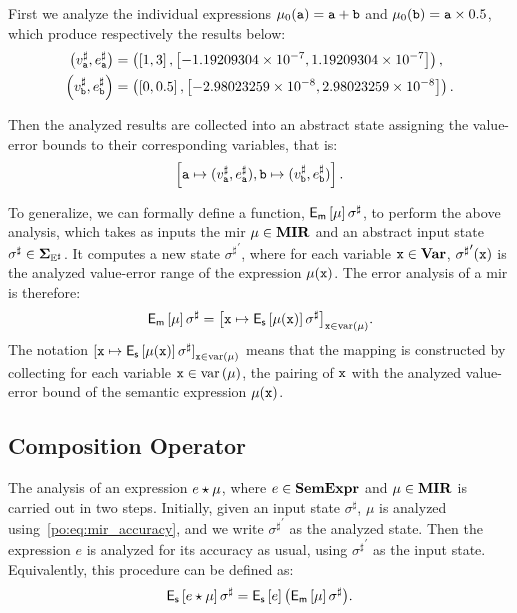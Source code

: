 First we analyze the individual expressions $\mu_0(\texttt{a}) = \texttt{a} + \texttt{b}$
and $\mu_0(\texttt{b}) = \texttt{a} \times 0.5$, which produce respectively the results
below:
\begin{align}
    \left(
        v^\sharp_{\texttt{a}}, e^\sharp_{\texttt{a}}
    \right) &= \left(
        \left[{1}, {3}\right],
        \left[{-1.19209304 \times 10^{-7}}, {1.19209304 \times 10^{-7}}\right]
    \right), \\
    \left(
        v^\sharp_{\texttt{b}}, e^\sharp_{\texttt{b}}
    \right) &= \left(
        \left[{0}, {0.5}\right],
        \left[{-2.98023259 \times 10^{-8}}, {2.98023259 \times 10^{-8}}\right]
    \right).
\end{align}

Then the analyzed results are collected into an abstract state assigning the
value-error bounds to their corresponding variables, that is:
\begin{equation}
    \left[
        \texttt{a} \mapsto (v^\sharp_{\texttt{a}}, e^\sharp_{\texttt{a}}),
        \texttt{b} \mapsto (v^\sharp_{\texttt{b}}, e^\sharp_{\texttt{b}})
    \right].
\end{equation}

To generalize, we can formally define a function,
$\operatorname{\mathsf{E}_\mathsf{m}}\left[{\mu}\right]{\sigma^\sharp}$, to perform the above analysis,
which takes as inputs the \gls{mir} $\mu \in \mathbf{MIR}$ and an abstract
input state $\sigma^\sharp \in \mathbf{\Sigma}_{\mathbb{E}^\sharp}$.  It computes a new state
${\sigma^\sharp}^\prime$, where for each variable $\texttt{x} \in \mathbf{Var}$,
${\sigma^\sharp}^\prime(\texttt{x})$ is the analyzed value-error range of the
expression $\mu(\texttt{x})$.  The error analysis of a \gls{mir} is therefore:
\begin{equation}
    \operatorname{\mathsf{E}_\mathsf{m}}\left[{\mu}\right]{\sigma^\sharp} = {\left[
        \texttt{x} \mapsto \operatorname{\mathsf{E}_\mathsf{s}}\left[{\mu(\texttt{x})}\right]{\sigma^\sharp}
    \right]}_{\texttt{x} \in \mathrm{var}\left(\mu\right)}.
    \label{po:eq:mir_accuracy}
\end{equation}
The notation ${[\texttt{x} \mapsto
\operatorname{\mathsf{E}_\mathsf{s}}\left[{\mu(\texttt{x})}\right]{\sigma^\sharp}]}_{\texttt{x} \in \mathrm{var}\left(\mu\right)}$ means
that the mapping is constructed by collecting for each variable $\texttt{x} \in
\mathrm{var}\left(\mu\right)$, the pairing of $\texttt{x}$ with the analyzed value-error bound of the
semantic expression $\mu(\texttt{x})$.

\subsection{Composition Operator}

The analysis of an expression $e \mathbin{\star} \mu$, where $e \in \mathbf{SemExpr}$ and $\mu
\in \mathbf{MIR}$ is carried out in two steps.  Initially, given an input state
$\sigma^\sharp$, $\mu$ is analyzed using~\eqref{po:eq:mir_accuracy}, and we
write ${\sigma^\sharp}^\prime$ as the analyzed state.  Then the expression $e$
is analyzed for its accuracy as usual, using ${\sigma^\sharp}^\prime$ as the
input state.  Equivalently, this procedure can be defined as:
\begin{equation}
    \operatorname{\mathsf{E}_\mathsf{s}}\left[{e \mathbin{\star} \mu}\right]{\sigma^\sharp}
    = \operatorname{\mathsf{E}_\mathsf{s}}\left[{e}\right]{\left( \ensuremath{\operatorname{\mathsf{E}_\mathsf{m}}}\left[{\mu}\right]{\sigma^\sharp} \right)}.
\end{equation}

